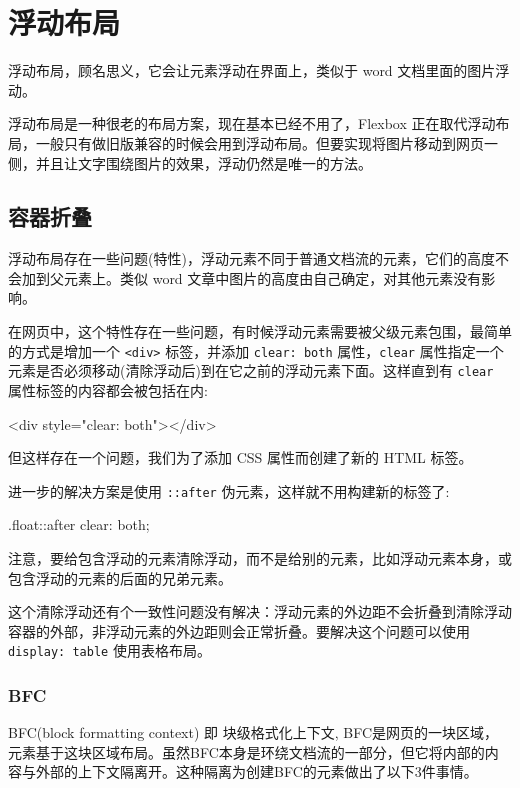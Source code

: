 \section{浮动布局}

浮动布局，顾名思义，它会让元素浮动在界面上，类似于 word 文档里面的图片浮动。

浮动布局是一种很老的布局方案，现在基本已经不用了，Flexbox 正在取代浮动布局，一般只有做旧版兼容的时候会用到浮动布局。但要实现将图片移动到网页一侧，并且让文字围绕图片的效果，浮动仍然是唯一的方法。

\subsection*{容器折叠}

浮动布局存在一些问题(特性)，浮动元素不同于普通文档流的元素，它们的高度不会加到父元素上。类似 word 文章中图片的高度由自己确定，对其他元素没有影响。

在网页中，这个特性存在一些问题，有时候浮动元素需要被父级元素包围，最简单的方式是增加一个 \texttt{<div>} 标签，并添加 \texttt{clear: both} 属性，\texttt{clear} 属性指定一个元素是否必须移动(清除浮动后)到在它之前的浮动元素下面。这样直到有 \texttt{clear} 属性标签的内容都会被包括在内:

\begin{HTML}
<div style="clear: both"></div>
\end{HTML}

但这样存在一个问题，我们为了添加 CSS 属性而创建了新的 HTML 标签。

进一步的解决方案是使用 \texttt{::after} 伪元素，这样就不用构建新的标签了:

\begin{HTML}
.float::after {
    clear: both;
}
\end{HTML}

注意，要给包含浮动的元素清除浮动，而不是给别的元素，比如浮动元素本身，或包含浮动的元素的后面的兄弟元素。

这个清除浮动还有个一致性问题没有解决：浮动元素的外边距不会折叠到清除浮动容器的外部，非浮动元素的外边距则会正常折叠。要解决这个问题可以使用 \texttt{display: table} 使用表格布局。

\subsubsection*{BFC}

BFC(block formatting context) 即 块级格式化上下文, BFC是网页的一块区域，元素基于这块区域布局。虽然BFC本身是环绕文档流的一部分，但它将内部的内容与外部的上下文隔离开。这种隔离为创建BFC的元素做出了以下3件事情。

